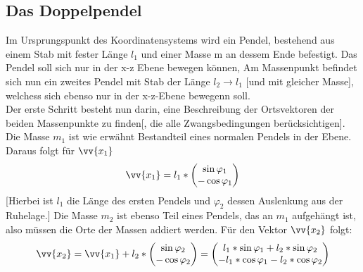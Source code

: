 \subsection{Das Doppelpendel}
Im Ursprungspunkt des Koordinatensystems wird ein Pendel, bestehend aus einem Stab mit fester Länge $l_1$ und einer Masse m an dessem Ende befestigt. Das Pendel soll sich nur in der x-z Ebene bewegen können, Am Massenpunkt befindet sich nun ein zweites Pendel mit Stab der Länge $l_2 \rightarrow l_1$ [und mit gleicher Masse], welchess sich ebenso nur in der x-z-Ebene bewegenn soll. \\
Der erste Schritt besteht nun darin, eine Beschreibung der Ortsvektoren der beiden Massenpunkte zu finden[, die alle Zwangsbedingungen berücksichtigen]. Die Masse $ m_1 $ ist wie erwähnt Bestandteil eines normalen Pendels in der Ebene. Daraus folgt für $ \vv{x_1} $
\begin{equation}
\vv{x_1}= l_1*\begin{pmatrix}
\sin \varphi_1 \\ -\cos \varphi_1
\end{pmatrix}
\end{equation}
[Hierbei ist $ l_1 $ die Länge des ersten Pendels und $ \varphi_2 $ dessen Auslenkung aus der Ruhelage.]
Die Masse $ m_2 $ ist ebenso Teil eines Pendels, das an $m_1$ aufgehängt ist, also müssen die Orte der Massen addiert werden. Für den Vektor $\vv{x_2}$ folgt:
\begin{equation}
\vv{x_2}= \vv{x_1} + l_2 * \begin{pmatrix}
\sin \varphi_2 \\ -\cos \varphi_2
\end{pmatrix}
= \begin{pmatrix}
l_1 * \sin \varphi_1 + l_2 * \sin \varphi_2 \\ - l_1 * \cos \varphi_1 - l_2 * \cos \varphi_2
\end{pmatrix}
\end{equation}


